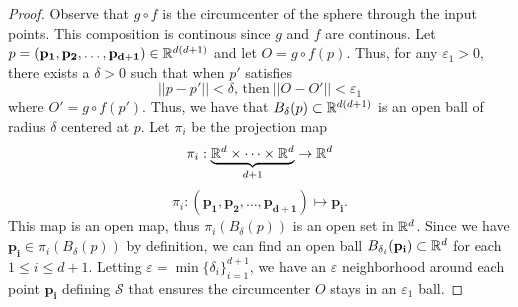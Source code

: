 \documentclass[letterpaper,titlepage]{article}
\begin{document}
\begin{proof}
        Observe that $g \circ f$ is the circumcenter of the sphere through the input points. This composition is continous since $g$ and $f$ are continous. Let $p = (\mathbf{p_1},\mathbf{p_2},\dots,\mathbf{p_{d+1}}) \in \mathbb{R}^{d(d+1)}$ and let $O=g \circ f(p)$. Thus, for any $\varepsilon_1>0$, there exists a $\delta>0$ such that when $p'$ satisfies $$||p-p'|| < \delta \text{, then}\ ||O-O'|| < \varepsilon_1$$
        where $O'=g \circ f(p').$ Thus, we have that $B_\delta(p) \subset \mathbb{R}^{d(d+1)}$ is an open ball of radius $\delta$ centered at $p$. Let $\pi_i$ be the projection map
        $$\pi_i: \underbrace{\mathbb{R}^d \times \dots \times \mathbb{R}^d}_{d+1} \to \mathbb{R}^d$$
        $$\pi_i: (\mathbf{p_1},\mathbf{p_2},\dots,\mathbf{p_{d+1}}) \mapsto \mathbf{p_i}.$$
        This map is an open map, thus $\pi_i(B_\delta(p))$ is an open set in $\mathbb{R}^d$. Since we have $\mathbf{p_i} \in \pi_i(B_\delta(p))$ by definition, we can find an open ball $B_{\delta_i}(\mathbf{p_i}) \subset \mathbb{R}^d$ for each $1\leq i \leq d+1$. Letting $\varepsilon = \min\{\delta_i\}_{i=1}^{d+1}$, we have an $\varepsilon$ neighborhood around each point $\mathbf{p_i}$ defining $\mathcal{S}$ that ensures the circumcenter $O$ stays in an $\varepsilon_1$ ball.

    \end{proof}
    
\end{document}
